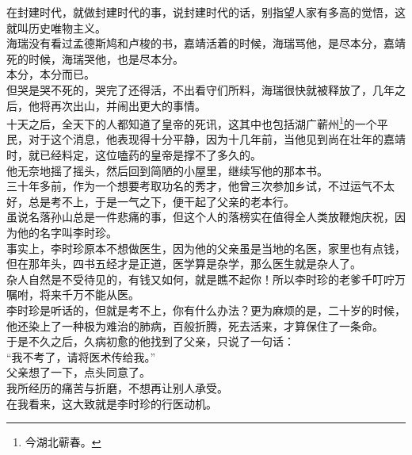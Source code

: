 \begin{multicols}{\theparacolNo}
在封建时代，就做封建时代的事，说封建时代的话，别指望人家有多高的觉悟，这就叫历史唯物主义。\\

海瑞没有看过孟德斯鸠和卢梭的书，嘉靖活着的时候，海瑞骂他，是尽本分，嘉靖死的时候，海瑞哭他，也是尽本分。\\

本分，本分而已。\\

但哭是哭不死的，哭完了还得活，不出看守们所料，海瑞很快就被释放了，几年之后，他将再次出山，并闹出更大的事情。\\

十天之后，全天下的人都知道了皇帝的死讯，这其中也包括湖广蕲州\footnote{今湖北蕲春。}的一个平民，对于这个消息，他表现得十分平静，因为十几年前，当他见到尚在壮年的嘉靖时，就已经料定，这位嗑药的皇帝是撑不了多久的。\\

他无奈地摇了摇头，然后回到简陋的小屋里，继续写他的那本书。\\

三十年多前，作为一个想要考取功名的秀才，他曾三次参加乡试，不过运气不太好，总是考不上，于是一气之下，便干起了父亲的老本行。\\

虽说名落孙山总是一件悲痛的事，但这个人的落榜实在值得全人类放鞭炮庆祝，因为他的名字叫李时珍。\\

事实上，李时珍原本不想做医生，因为他的父亲虽是当地的名医，家里也有点钱，但在那年头，四书五经才是正道，医学算是杂学，那么医生就是杂人了。\\

杂人自然是不受待见的，有钱又如何，就是瞧不起你！所以李时珍的老爹千叮咛万嘱咐，将来千万不能从医。\\

李时珍是听话的，但就是考不上，你有什么办法？更为麻烦的是，二十岁的时候，他还染上了一种极为难治的肺病，百般折腾，死去活来，才算保住了一条命。\\

于是不久之后，久病初愈的他找到了父亲，只说了一句话：\\

“我不考了，请将医术传给我。”\\

父亲想了一下，点头同意了。\\

我所经历的痛苦与折磨，不想再让别人承受。\\

在我看来，这大致就是李时珍的行医动机。\\


\end{multicols}
